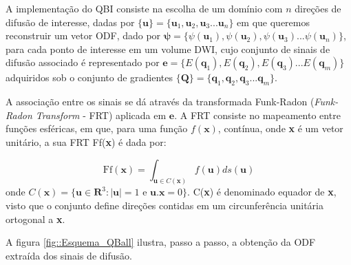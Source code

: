 \documentclass[
    12pt,                %
    oneside,            %
    a4paper,            %
    english,            %
    french,                %
    spanish,            %
    brazil                %
    ]{abntex2}
\begin{document}
A implementação do QBI consiste na escolha de um domínio com $n$ direções de difusão de interesse, dadas por $\{\textbf{u} \}= \{ \textbf{u}_1, \textbf{u}_2, \textbf{u}_3 ... \textbf{u}_n\}$ em que queremos reconstruir um vetor ODF, dado por $ \boldsymbol{\psi} = \{ \psi(\mathbf{u}_1), \psi(\mathbf{u}_2), \psi(\mathbf{u}_3) ... \psi(\mathbf{u}_n)\}$, para cada ponto de interesse em um volume DWI, cujo conjunto de sinais de difusão associado é representado por $\boldsymbol{e} = \{ E(\mathbf{q}_1), E(\mathbf{q}_2), E(\mathbf{q}_3) ... E(\mathbf{q}_m)\}$ adquiridos sob o conjunto de gradientes $\{\textbf{Q} \}= \{ \textbf{q}_1, \textbf{q}_2, \textbf{q}_3 ... \textbf{q}_m\}$. 


A associação entre os sinais se dá através da transformada Funk-Radon (\textit{Funk-Radon Transform} - FRT) aplicada em $ \boldsymbol{e}$. A FRT consiste no mapeamento entre funções esféricas, em que, para uma função $f(\mathbf{x})$, contínua, onde \textbf{x} é um vetor unitário, a sua FRT Ff(\textbf{x}) é dada por:

\begin{equation}
    \text{Ff}(\textbf{x}) = \int_{\textbf{u}\in C(\textbf{x})}f(\textbf{u})ds(\textbf{u})
\end{equation}
onde $C(\textbf{x}) = \{ \mathbf{u} \in  \mathbf{R}^3:|\mathbf{u}|=1 \text{ e } \mathbf{u}.\mathbf{x} = 0  \}$. C(\textbf{x}) é denominado equador de \textbf{x}, visto que o conjunto define direções contidas em um circunferência unitária ortogonal a \textbf{x}.


A figura \ref{fig::Esquema_QBall} ilustra, passo a passo, a obtenção da ODF extraída dos sinais de difusão.
\end{document}
